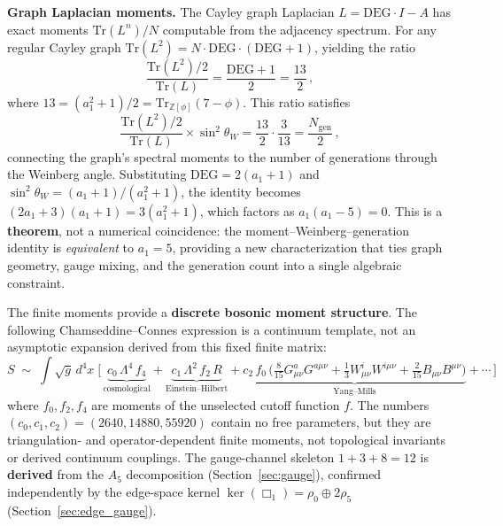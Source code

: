\documentclass[12pt,a4paper]{article}
\theoremstyle{definition}
\begin{document}
\textbf{Graph Laplacian moments.}  The Cayley graph Laplacian $L = \mathrm{DEG}\cdot I - A$ has exact moments $\mathrm{Tr}(L^n)/N$ computable from the adjacency spectrum.  For any regular Cayley graph $\mathrm{Tr}(L^2) = N\cdot\mathrm{DEG}\cdot(\mathrm{DEG}+1)$, yielding the ratio
\begin{equation}
\frac{\mathrm{Tr}(L^2)/2}{\mathrm{Tr}(L)} = \frac{\mathrm{DEG}+1}{2} = \frac{13}{2}\,,
\end{equation}
where $13 = (a_1^2+1)/2 = \mathrm{Tr}_{\mathbb{Z}[\phi]}(7-\phi)$.  This ratio satisfies
\begin{equation}
\frac{\mathrm{Tr}(L^2)/2}{\mathrm{Tr}(L)} \times \sin^2\theta_W = \frac{13}{2}\cdot\frac{3}{13} = \frac{N_{\mathrm{gen}}}{2}\,,
\label{eq:moment_weinberg}
\end{equation}
connecting the graph's spectral moments to the number of generations through the Weinberg angle.  Substituting $\mathrm{DEG} = 2(a_1\!+\!1)$ and $\sin^2\theta_W = (a_1\!+\!1)/(a_1^2\!+\!1)$, the identity becomes $(2a_1\!+\!3)(a_1\!+\!1) = 3(a_1^2\!+\!1)$, which factors as $a_1(a_1 - 5) = 0$.  This is a \textbf{theorem}, not a numerical coincidence: the moment--Weinberg--generation identity is \emph{equivalent} to $a_1 = 5$, providing a new characterization that ties graph geometry, gauge mixing, and the generation count into a single algebraic constraint.

The finite moments provide a \textbf{discrete bosonic moment structure}.  The
following Chamseddine--Connes expression is a continuum template, not an
asymptotic expansion derived from this fixed finite matrix:
\begin{equation}
S \;\sim\; \int\!\sqrt{g}\,d^4x\;\Big[\, \underbrace{c_0\,\Lambda^4\,f_4}_{\text{cosmological}} + \underbrace{c_1\,\Lambda^2\,f_2\,R}_{\text{Einstein--Hilbert}} + \underbrace{c_2\,f_0\,\big(\tfrac{8}{15}G^a_{\mu\nu}G^{a\mu\nu} + \tfrac{1}{3}W^i_{\mu\nu}W^{i\mu\nu} + \tfrac{2}{15}B_{\mu\nu}B^{\mu\nu}\big)}_{\text{Yang--Mills}} + \cdots\,\Big]
\label{eq:lagrangian_explicit}
\end{equation}
where $f_0, f_2, f_4$ are moments of the unselected cutoff function $f$. The numbers $(c_0, c_1, c_2) = (2640, 14880, 55920)$ contain no free parameters, but they are triangulation- and operator-dependent finite moments, not topological invariants or derived continuum couplings.  The gauge-channel skeleton $1 + 3 + 8 = 12$ is \textbf{derived} from the $A_5$ decomposition (Section~\ref{sec:gauge}), confirmed independently by the edge-space kernel $\ker(\Box_1) = \rho_0 \oplus 2\rho_5$ (Section~\ref{sec:edge_gauge}).
\end{document}
